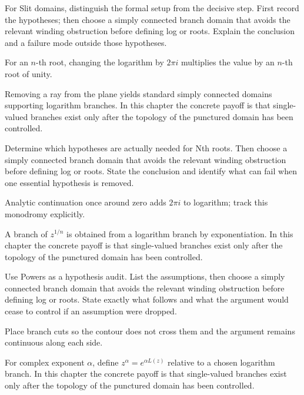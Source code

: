 \begin{exercise}\label{exr:iv14-04}
For Slit domains, distinguish the formal setup from the decisive step. First record the hypotheses; then choose a simply connected branch domain that avoids the relevant winding obstruction before defining log or roots. Explain the conclusion and a failure mode outside those hypotheses.
\end{exercise}
\begin{hint}
For an \(n\)-th root, changing the logarithm by \(2\pi i\) multiplies the value by an \(n\)-th root of unity.
\end{hint}
\begin{solution}
Removing a ray from the plane yields standard simply connected domains supporting logarithm branches. In this chapter the concrete payoff is that single-valued branches exist only after the topology of the punctured domain has been controlled.
\end{solution}

\begin{exercise}\label{exr:iv14-05}
Determine which hypotheses are actually needed for Nth roots. Then choose a simply connected branch domain that avoids the relevant winding obstruction before defining log or roots. State the conclusion and identify what can fail when one essential hypothesis is removed.
\end{exercise}
\begin{hint}
Analytic continuation once around zero adds \(2\pi i\) to logarithm; track this monodromy explicitly.
\end{hint}
\begin{solution}
A branch of $z^{1/n}$ is obtained from a logarithm branch by exponentiation. In this chapter the concrete payoff is that single-valued branches exist only after the topology of the punctured domain has been controlled.
\end{solution}

\begin{exercise}\label{exr:iv14-06}
Use Powers as a hypothesis audit. List the assumptions, then choose a simply connected branch domain that avoids the relevant winding obstruction before defining log or roots. State exactly what follows and what the argument would cease to control if an assumption were dropped.
\end{exercise}
\begin{hint}
Place branch cuts so the contour does not cross them and the argument remains continuous along each side.
\end{hint}
\begin{solution}
For complex exponent $\alpha$, define $z^\alpha=e^{\alpha L(z)}$ relative to a chosen logarithm branch. In this chapter the concrete payoff is that single-valued branches exist only after the topology of the punctured domain has been controlled.
\end{solution}

